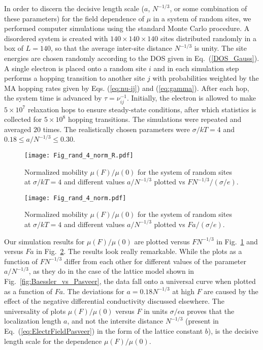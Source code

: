 \documentclass[aps,reprint,amsmath,amssymb,superscriptaddress,showpacs,prb]{revtex4-1}
\renewcommand{\alpha}{ a }
\begin{document}
In order to discern the decisive length scale ($\alpha$, $N^{-1/3}$, or some combination of these parameters) for the field dependence of $\mu$ in a system of random sites, we performed computer simulations using the standard Monte Carlo procedure. A disordered system is created with $140\times 140\times 140$ sites distributed randomly in a box of $L=140$, so that the average inter-site distance $N^{-1/3}$ is unity. The site energies are chosen randomly according to the DOS given in Eq.~(\ref{DOS_Gauss}). A single electron is placed onto a random site $i$ and in each simulation step performs a hopping transition to another site $j$ with probabilities weighted by the MA hopping rates given by Eqs. (\ref{eq:nu-ij}) and (\ref{eq:gamma}). After each hop, the system time is advanced by $\tau = \nu_{ij}^{-1}$. Initially, the electron is allowed to make $5\times 10^{7}$ relaxation hops to ensure steady-state conditions, after which statistics is collected for $5\times 10^{8}$ hopping transitions. The simulations were repeated and averaged $20$ times. The realistically chosen parameters were $\sigma/kT=4$ and $0.18 \leq \alpha/N^{-1/3} \leq 0.30$.

\begin{figure}
	\texttt{[image: Fig\_rand\_4\_norm\_R.pdf]}
	\caption{Normalized mobility $\mu(F)/\mu(0)$ for the system of random sites at $\sigma/kT =4$ and different values $\alpha/N^{-1/3}$ plotted vs $FN^{-1/3}/(\sigma/e)$.}
	\label{fig:nonuniversality}
\end{figure}

\begin{figure}
	\texttt{[image: Fig\_rand\_4\_norm.pdf]}
	\caption{Normalized mobility $\mu(F)/\mu(0)$ for the system of random sites at $\sigma/kT =4$ and different values $\alpha/N^{-1/3}$ plotted vs $F\alpha/(\sigma/e)$.}
	\label{fig:universality}
\end{figure}



Our simulation results for $\mu(F)/\mu(0)$ are plotted versus $FN^{-1/3}$ in Fig.~\ref{fig:nonuniversality} and versus $F\alpha$ in Fig.~\ref{fig:universality}.
The results look really remarkable. While the plots as a function of $FN^{-1/3}$ differ from each other for different values of the parameter $\alpha/N^{-1/3}$, as they do in the case of the lattice model shown in Fig.~\ref{fig:Baessler_vs_Pasveer}, the data fall onto a universal curve when plotted as a function of $F\alpha$. The deviations for $\alpha = 0.18N^{-1/3}$ at high $F$ are caused by the effect of the negative differential conductivity discussed elsewhere\cite{Nguyen1981,Nenashev2008NDC}. The universality of plots $\mu(F)/\mu(0)$ versus $F$ in units $\sigma/e\alpha$ proves that the localization length $\alpha$, and not the intersite distance $N^{-1/3}$ (present in Eq.~(\ref{eq:ElectrFieldPasveer}) in the form of the lattice constant $b$), is the decisive length scale for the dependence $\mu(F)/\mu(0)$.
\end{document}
